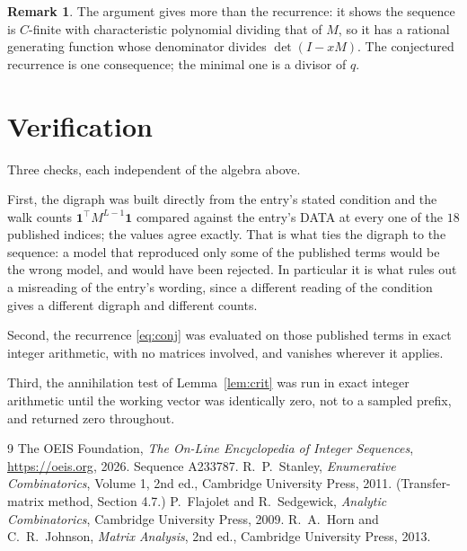 \documentclass[11pt,a4paper]{article}
\theoremstyle{plain}
\theoremstyle{definition}
\newtheorem{remark}[theorem]{Remark}
\begin{document}
\begin{remark}
The argument gives more than the recurrence: it shows the sequence is $C$-finite with
characteristic polynomial dividing that of $M$, so it has a rational generating function
whose denominator divides $\det(I-xM)$. The conjectured recurrence is one consequence; the
minimal one is a divisor of $q$.
\end{remark}

\section{Verification}

Three checks, each independent of the algebra above.

First, the digraph was built directly from the entry's stated condition and the walk counts
$\mathbf{1}^{\!\top}M^{L-1}\mathbf{1}$ compared against the entry's DATA at
every one of the $18$ published indices; the values agree exactly. That is what ties
the digraph to the sequence: a model that reproduced only some of the published terms would
be the wrong model, and would have been rejected. In particular it is what rules out a
misreading of the entry's wording, since a different reading of the condition gives a
different digraph and different counts.

Second, the recurrence \eqref{eq:conj} was evaluated on those published terms in exact
integer arithmetic, with no matrices involved, and vanishes wherever it applies.

Third, the annihilation test of Lemma~\ref{lem:crit} was run in exact integer arithmetic
until the working vector was identically zero, not to a sampled prefix, and returned zero
throughout.

\begin{thebibliography}{9}
 The OEIS Foundation, \emph{The On-Line Encyclopedia of Integer
Sequences}, \url{https://oeis.org}, 2026. Sequence A233787.
 R.~P.~Stanley, \emph{Enumerative Combinatorics}, Volume 1, 2nd ed.,
Cambridge University Press, 2011. (Transfer-matrix method, Section 4.7.)
 P.~Flajolet and R.~Sedgewick, \emph{Analytic Combinatorics}, Cambridge
University Press, 2009.
 R.~A.~Horn and C.~R.~Johnson, \emph{Matrix Analysis}, 2nd ed., Cambridge
University Press, 2013.
\end{thebibliography}
\end{document}
